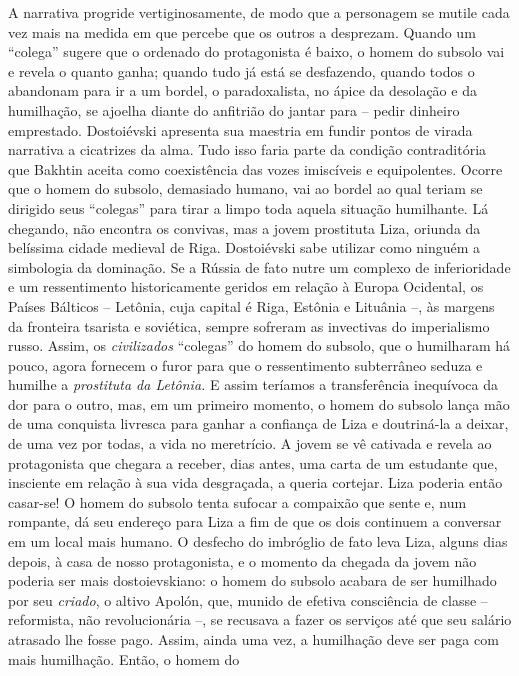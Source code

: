 A narrativa progride vertiginosamente, de modo que a personagem se
mutile cada vez mais na medida em que percebe que os outros a desprezam.
Quando um ``colega'' sugere que o ordenado do protagonista é baixo, o
homem do subsolo vai e revela o quanto ganha; quando tudo já está se
desfazendo, quando todos o abandonam para ir a um bordel, o
paradoxalista, no ápice da desolação e da humilhação, se ajoelha diante
do anfitrião do jantar para -- pedir dinheiro emprestado. Dostoiévski
apresenta sua maestria em fundir pontos de virada narrativa a cicatrizes
da alma. Tudo isso faria parte da condição contraditória que Bakhtin
aceita como coexistência das vozes imiscíveis e equipolentes. Ocorre que
o homem do subsolo, demasiado humano, vai ao bordel ao qual teriam se
dirigido seus ``colegas'' para tirar a limpo toda aquela situação
humilhante. Lá chegando, não encontra os convivas, mas a jovem
prostituta Liza, oriunda da belíssima cidade medieval de Riga.
Dostoiévski sabe utilizar como ninguém a simbologia da dominação. Se a
Rússia de fato nutre um complexo de inferioridade e um ressentimento
historicamente geridos em relação à Europa Ocidental, os Países Bálticos
-- Letônia, cuja capital é Riga, Estônia e Lituânia --, às margens da
fronteira tsarista e soviética, sempre sofreram as invectivas do
imperialismo russo. Assim, os \emph{civilizados} ``colegas'' do homem do
subsolo, que o humilharam há pouco, agora fornecem o furor para que o
ressentimento subterrâneo seduza e humilhe a \emph{prostituta da
Letônia.} E assim teríamos a transferência inequívoca da dor para o
outro, mas, em um primeiro momento, o homem do subsolo lança mão de uma
conquista livresca para ganhar a confiança de Liza e doutriná-la a
deixar, de uma vez por todas, a vida no meretrício. A jovem se vê
cativada e revela ao protagonista que chegara a receber, dias antes, uma
carta de um estudante que, insciente em relação à sua vida desgraçada, a
queria cortejar. Liza poderia então casar-se! O homem do subsolo tenta
sufocar a compaixão que sente e, num rompante, dá seu endereço para Liza
a fim de que os dois continuem a conversar em um local mais humano. O
desfecho do imbróglio de fato leva Liza, alguns dias depois, à casa de
nosso protagonista, e o momento da chegada da jovem não poderia ser mais
dostoievskiano: o homem do subsolo acabara de ser humilhado por seu
\emph{criado}, o altivo Apolón, que, munido de efetiva consciência de
classe -- reformista, não revolucionária --, se recusava a fazer os
serviços até que seu salário atrasado lhe fosse pago. Assim, ainda uma
vez, a humilhação deve ser paga com mais humilhação. Então, o homem do
